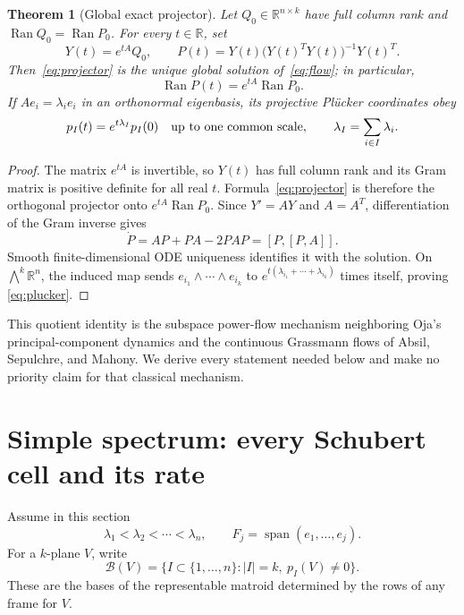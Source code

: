 \documentclass[10pt]{article}
\newtheorem{theorem}{Theorem}
\newcommand{\R}{\mathbb R}
\newcommand{\Ran}{\operatorname{Ran}}
\newcommand{\Span}{\operatorname{span}}
\begin{document}
\begin{theorem}[Global exact projector]\label{thm:global}
Let $Q_0\in\R^{n\times k}$ have full column rank and
$\Ran Q_0=\Ran P_0$.  For every $t\in\R$, set
\begin{equation}\label{eq:projector}
 Y(t)=e^{tA}Q_0,\qquad
 P(t)=Y(t)\bigl(Y(t)^TY(t)\bigr)^{-1}Y(t)^T.
\end{equation}
Then~\eqref{eq:projector} is the unique global solution of~\eqref{eq:flow};
in particular,
\[
 \Ran P(t)=e^{tA}\Ran P_0.
\]
If $Ae_i=\lambda_i e_i$ in an orthonormal eigenbasis, its projective
Pl\"ucker coordinates obey
\begin{equation}\label{eq:plucker}
 p_I(t)=e^{t\lambda_I}p_I(0)\quad\hbox{up to one common scale},
 \qquad \lambda_I=\sum_{i\in I}\lambda_i.
\end{equation}
\end{theorem}
\begin{proof}
The matrix $e^{tA}$ is invertible, so $Y(t)$ has full column rank and its Gram
matrix is positive definite for all real $t$.  Formula~\eqref{eq:projector}
is therefore the orthogonal projector onto $e^{tA}\Ran P_0$.  Since
$Y'=AY$ and $A=A^T$, differentiation of the Gram inverse gives
\[
 \dot P=AP+PA-2PAP=[P,[P,A]].
\]
Smooth finite-dimensional ODE uniqueness identifies it with the solution.
On $\bigwedge^k\R^n$, the induced map sends
$e_{i_1}\wedge\cdots\wedge e_{i_k}$ to
$e^{t(\lambda_{i_1}+\cdots+\lambda_{i_k})}$ times itself, proving
\eqref{eq:plucker}.
\end{proof}

This quotient identity is the subspace power-flow mechanism neighboring
Oja's principal-component dynamics and the continuous Grassmann flows of
Absil, Sepulchre, and Mahony.  We derive every statement needed below and make
no priority claim for that classical mechanism.

\section{Simple spectrum: every Schubert cell and its rate}
Assume in this section
\begin{equation}\label{eq:simple}
 \lambda_1<\lambda_2<\cdots<\lambda_n,
 \qquad F_j=\Span(e_1,\ldots,e_j).
\end{equation}
For a $k$-plane $V$, write
\[
 \mathcal B(V)=\{I\subset\{1,\ldots,n\}:|I|=k,\ p_I(V)\ne0\}.
\]
These are the bases of the representable matroid determined by the rows of
any frame for $V$.
\end{document}
